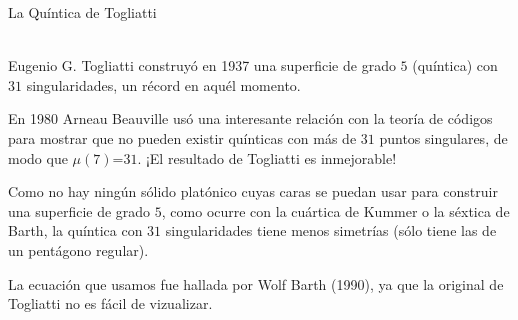 \documentclass[es]{SurferDesc}%
\begin{document}
\footnotesize


\begin{surferPage}
  \begin{surferTitle}La Quíntica de Togliatti\end{surferTitle}  \\
    Eugenio G. Togliatti construyó en 1937 una superficie de grado $5$ (quíntica)
    con $31$ singularidades, un récord en aquél momento.

    En 1980 Arneau Beauville usó una interesante relación con la teoría de códigos 
    para mostrar que no pueden existir quínticas con más de $31$ puntos singulares,
    de modo que $\mu(7)$=$31$. ¡El resultado de Togliatti es inmejorable!
    
    Como no hay ningún sólido platónico cuyas caras se puedan usar para construir una 
    superficie de grado $5$, como ocurre con la cuártica de Kummer o la séxtica de Barth, 
    la quíntica con $31$ singularidades tiene menos simetrías (sólo tiene las de un pentágono regular).

 La ecuación que usamos fue hallada por Wolf Barth (1990), ya que la original de Togliatti no es fácil de vizualizar.


  \begin{surferText}
     \end{surferText}
\end{surferPage}
\end{document}
